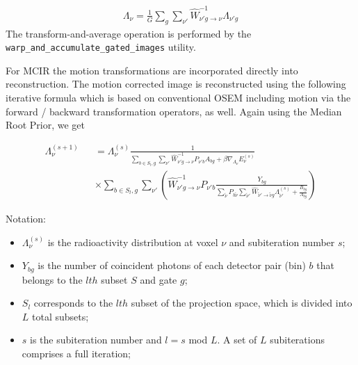 \documentclass{article}
\begin{document}
{{{%
\begin{equation}
\begin{array}{rrr}
\Lambda_{\nu}=\frac{1}{G}\sum\limits_{g}\sum\limits_{\nu'}\hat{W}^{-1} _{\nu'g\rightarrow \nu}\Lambda_{\nu'g}
\end{array}
\end{equation}
The transform-and-average operation is performed by the
\texttt{warp\_and\_accumulate\_gated\_images} utility.

For MCIR the motion transformations are incorporated directly into reconstruction. The motion corrected
image is reconstructed using the following iterative formula which is based on conventional OSEM
including motion via the forward / backward transformation operators, as well. Again using the Median Root Prior, we get

\begin{equation}
\begin{array}{lcl}
\Lambda_{\nu}^{(s+1)}&&=\Lambda_{\nu}^{(s)} \frac{1}{ \sum\limits_{b\in S_{l}, g} \sum\limits_{\nu'} \hat{W}^{-1} _{\nu'g\rightarrow \nu}P_{\nu' b}A_{bg}+\beta \nabla_{\Lambda_{\nu}} E_{\nu}^{(s)}}\\
&&\times \sum\limits_{b\in S_{l}, g} \sum\limits_{\nu'}\left(\hat{W}^{-1} _{\nu'g\rightarrow \nu}P_{\nu' b}\frac{Y_{bg}}{\sum\limits_{\tilde{\nu}}P_{b\tilde{\nu}}\sum\limits_{\tilde{\nu}'}\hat{W} _{\tilde{\nu}'\rightarrow \tilde{\nu}g}\Lambda_{\tilde{\nu}'}^{(s)}+\frac{B_{bg}}{A_{bg}}}\right)
\end{array}
\end{equation}



Notation: 
\begin{itemize}
\item $\Lambda_{\nu}^{(s)}$ is the radioactivity distribution at voxel ${\nu}$ and subiteration number $s$;

\item $Y_{bg}$ is the number of coincident photons of each detector pair (bin) $b$ that belongs to the $lth$ subset $S$ and gate $g$;

\item $S_{l}$ corresponds to the $lth$ subset of the projection space, which is divided into $L$ total subsets;

\item $s$ is the subiteration number and $l = s$ mod $L$. A set of $L$ subiterations comprises a full iteration;


\end{itemize}}}}
\end{document}
